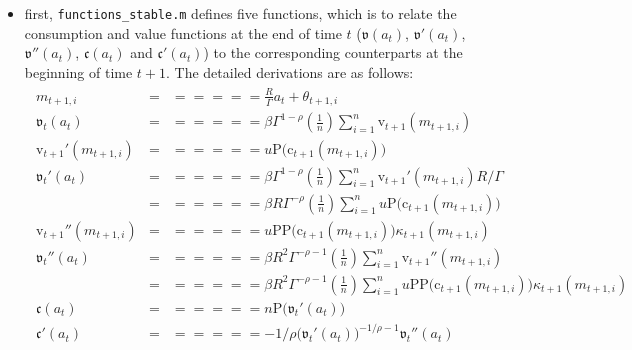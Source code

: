 \documentclass[titlepage,abstract]{\econtex}
\begin{document}
\begin{itemize}
     \item first, \texttt{functions\_stable.m} defines five functions, which is to relate the consumption and value functions at the end of time $t$ ($\ensuremath{\mathfrak{v}}(a_{t})$, $\ensuremath{\mathfrak{v}}'(a_{t})$,
            $\ensuremath{\mathfrak{v}}''(a_{t})$, $\ensuremath{\mathfrak{c}}(a_{t})$ and $\ensuremath{\mathfrak{c}}'(a_{t})$) to the corresponding counterparts at the beginning of time $t+1$. The detailed derivations are as follows:
            \begin{equation}\begin{gathered}\begin{aligned}
            m_{t+1, i}      &=& =  =  =  =  =  \frac{R}{\Gamma} {a}_{t} + \theta_{t+1, i} \\
            \ensuremath{\mathfrak{v}}_{t}(a_{t})      & = &  =  =  =  =  = \beta \Gamma^{1-\rho} \left(\frac{1}{n}\right)\sum_{i=1}^{n} \ensuremath{\mathrm{v}}_{t+1}(m_{t+1, i}) \\
            \ensuremath{\mathrm{v}}_{t+1}'(m_{t+1, i})      &=& =  =  =  =  =  u\text{P}(\ensuremath{\mathrm{c}}_{t+1}(m_{t+1, i})\big) \\
            \ensuremath{\mathfrak{v}}_{t}'(a_{t})      & = &  =  =  =  =  = \beta \Gamma^{1-\rho} \left(\frac{1}{n}\right)\sum_{i=1}^{n} \ensuremath{\mathrm{v}}_{t+1}'(m_{t+1, i}) R/\Gamma\\
                 &=& =  =  =  =  =  \beta R \Gamma^{-\rho} \left(\frac{1}{n}\right)\sum_{i=1}^{n}
            u\text{P}(\ensuremath{\mathrm{c}}_{t+1}(m_{t+1, i})\big) \\
            \ensuremath{\mathrm{v}}_{t+1}''(m_{t+1, i})      &=& =  =  =  =  =  u\text{PP}\big(\ensuremath{\mathrm{c}}_{t+1}(m_{t+1, i})\big) \kappa_{t+1}(m_{t+1, i}) \\
            \ensuremath{\mathfrak{v}}_{t}''(a_{t})      & = &  =  =  =  =  = \beta R^{2} \Gamma^{-\rho-1} \left(\frac{1}{n}\right)\sum_{i=1}^{n} \ensuremath{\mathrm{v}}_{t+1}''(m_{t+1, i}) \\
                 &=& =  =  =  =  =  \beta R^{2} \Gamma^{-\rho-1} \left(\frac{1}{n}\right)\sum_{i=1}^{n}
              u\text{PP}\big(\ensuremath{\mathrm{c}}_{t+1}(m_{t+1, i})\big) \ensuremath{\kappa}_{t+1}(m_{t+1, i}) \\
              \ensuremath{\mathfrak{c}}(a_{t})      &=& =  =  =  =  =  n\text{P}\big(\ensuremath{\mathfrak{v}}_{t}'(a_{t})\big) \\
              \ensuremath{\mathfrak{c}}'(a_{t})      &=& =  =  =  =  = -1/\rho \big(\ensuremath{\mathfrak{v}}_{t}'(a_{t})\big)^{-1/\rho-1} \ensuremath{\mathfrak{v}}_{t}''(a_{t}) \\

\end{aligned}
\end{gathered}
\end{equation}
\end{itemize}
\end{document}
